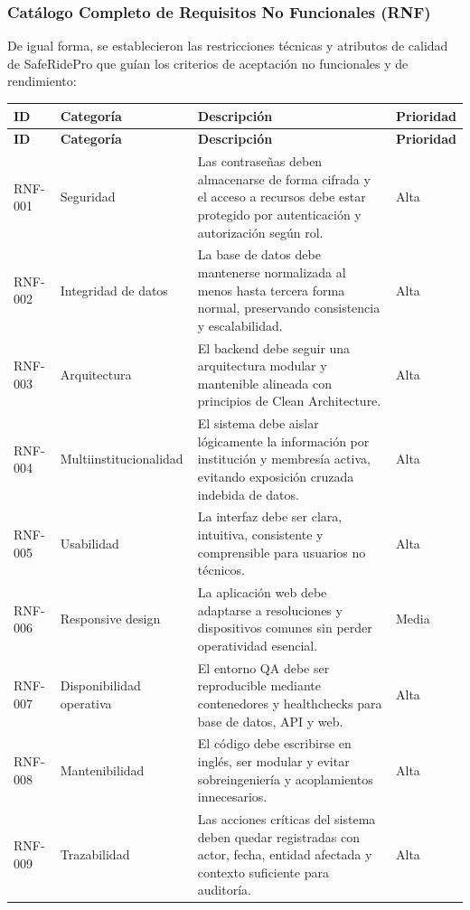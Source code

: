 \documentclass{article}
\begin{document}
\subsubsection*{Catálogo Completo de Requisitos No Funcionales (RNF)}
De igual forma, se establecieron las restricciones técnicas y atributos de calidad de SafeRidePro que guían los criterios de aceptación no funcionales y de rendimiento:

\begin{longtable}{|P{1.9cm}|P{3.9cm}|P{7.1cm}|P{2.1cm}|}
\hline
{}
\textbf{ID} & \textbf{Categoría} & \textbf{Descripción} & \textbf{Prioridad} \\
\hline
\endfirsthead
\hline
{}
\textbf{ID} & \textbf{Categoría} & \textbf{Descripción} & \textbf{Prioridad} \\
\hline
\endhead
RNF-001 & Seguridad & Las contraseñas deben almacenarse de forma cifrada y el acceso a recursos debe estar protegido por autenticación y autorización según rol. & Alta \\
\hline
RNF-002 & Integridad de datos & La base de datos debe mantenerse normalizada al menos hasta tercera forma normal, preservando consistencia y escalabilidad. & Alta \\
\hline
RNF-003 & Arquitectura & El backend debe seguir una arquitectura modular y mantenible alineada con principios de Clean Architecture. & Alta \\
\hline
RNF-004 & Multiinstitucionalidad & El sistema debe aislar lógicamente la información por institución y membresía activa, evitando exposición cruzada indebida de datos. & Alta \\
\hline
RNF-005 & Usabilidad & La interfaz debe ser clara, intuitiva, consistente y comprensible para usuarios no técnicos. & Alta \\
\hline
RNF-006 & Responsive design & La aplicación web debe adaptarse a resoluciones y dispositivos comunes sin perder operatividad esencial. & Media \\
\hline
RNF-007 & Disponibilidad operativa & El entorno QA debe ser reproducible mediante contenedores y healthchecks para base de datos, API y web. & Alta \\
\hline
RNF-008 & Mantenibilidad & El código debe escribirse en inglés, ser modular y evitar sobreingeniería y acoplamientos innecesarios. & Alta \\
\hline
RNF-009 & Trazabilidad & Las acciones críticas del sistema deben quedar registradas con actor, fecha, entidad afectada y contexto suficiente para auditoría. & Alta \\

\end{longtable}
\end{document}
